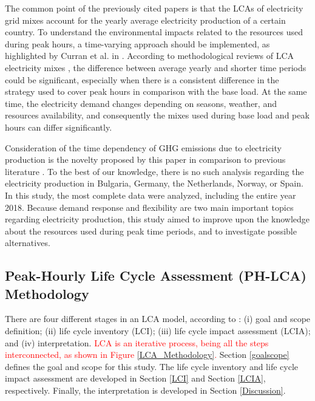 {The common point of the previously cited papers is that the LCAs of electricity grid mixes account for the yearly average electricity production of a certain country. To understand  the environmental impacts related to the resources used during peak hours, a time-varying approach should be implemented, as highlighted by Curran et al. in \cite{CURRAN2005}.} 
{According to methodological reviews of LCA electricity mixes \cite{Soimakallio2011,Turconi2013LifeLimitations}, the difference between average yearly and shorter time periods could be significant, especially when there is a consistent difference in the strategy used to cover peak hours in comparison with the base load. At the same time, the electricity demand changes depending on seasons, weather, and resources availability, and consequently the mixes used  during base load and peak hours can differ significantly.}

{Consideration of the time dependency of GHG emissions due to electricity production is the novelty proposed by this paper in comparison to previous literature \cite{Garcia-Gusano2017, Lund2010EnergyLCA, Jones2017AnGeneration, Thomson2017MarginalBritain, Howard2017CurrentCity, Garcia2014, Garcia2016MarginalVehicles, Moro2017}}. To the best of our knowledge, there is no such analysis regarding the electricity production in Bulgaria, Germany, the Netherlands, Norway, or Spain. In this study, the most complete data were analyzed, including the entire year 2018. Because demand response and flexibility are two main important topics regarding electricity production, this study aimed to improve upon the knowledge about the resources used during peak time periods, and to investigate possible alternatives. 



\subsection{Peak-Hourly Life Cycle Assessment (PH-LCA) Methodology}


{There are four different stages in an LCA model, according to \cite{2006ISOGuidelines, 2006ISOFramework}: (i) goal and scope definition; (ii) life cycle inventory (LCI); (iii) life cycle impact assessment (LCIA); and (iv) interpretation. \textcolor{red}{LCA is an iterative process, being all the steps interconnected, as shown in Figure \ref{LCA_Methodology}.}}
{Section \ref{goalscope} defines the goal and scope for this study.} The life cycle inventory and life cycle impact assessment are developed in Section \ref{LCI} and Section \ref{LCIA}, respectively. {Finally, the interpretation is developed in Section \ref{Discussion}}.

